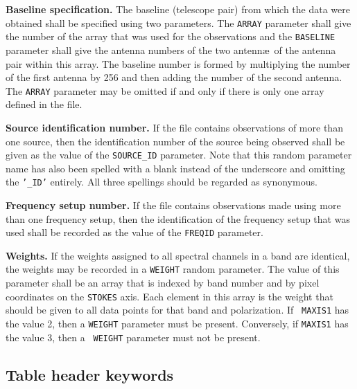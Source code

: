 \documentclass[twoside]{article}
\newcommand{\Hi}[1]{\textcolor{hicol}{#1}}
\begin{document}
{\bf Baseline specification.} The baseline \Hi{(telescope pair)} from
which the data were obtained shall be specified using two parameters.
The {\tt ARRAY} parameter shall give the number of the array that was
used for the observations and the {\tt BASELINE} parameter shall give
the antenna numbers of the two antenn\ae\ \Hi{of the antenna pair
  within} this array.  The baseline number is formed by multiplying
the number of the first antenna by 256 and then adding the number of
the second antenna.  The {\tt ARRAY} parameter may be omitted if
\Hi{and only if} there is only one array defined in the file.

{\bf Source identification number.} If the file contains observations
of more than one source, then the identification number of the source
being observed shall be given as the value of the {\tt SOURCE\_ID}
parameter.  \Hi{Note that this random parameter name has also been
  spelled with a blank instead of the underscore and omitting the
{\tt '\_ID'} entirely.  All three spellings should be regarded as
synonymous.}

{\bf Frequency setup number.} If the file contains observations made
using more than one frequency setup, then the identification of the
frequency setup that was used shall be recorded as the value of the
{\tt FREQID} parameter.

{\bf Weights.}  If the weights assigned to all spectral channels in a
band are identical, the weights may be recorded in a {\tt WEIGHT}
random parameter.  The value of this parameter shall be an array that
is indexed by band number and by pixel coordinates on the {\tt STOKES}
axis.  Each element in this array is the weight that should be given
to \Hi{all} data points for that band and polarization.  If {\tt
  MAXIS1} has the value 2, then a {\tt WEIGHT} parameter must be
present.  Conversely, if {\tt MAXIS1} has the value 3, then a {\tt
  WEIGHT} parameter must not be present.

\subsection{Table header keywords}
\end{document}
